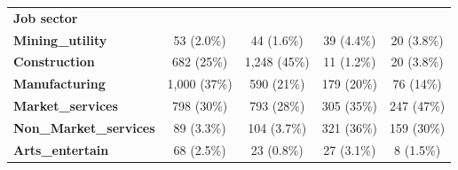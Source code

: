 \begin{table}
{\begin{tabular}[t]{>{}lcccc}
\textbf{Job sector} &  &  &  & \\
\textbf{Mining\_utility} & 53 (2.0\%) & 44 (1.6\%) & 39 (4.4\%) & 20 (3.8\%)\\
\addlinespace
\textbf{Construction} & 682 (25\%) & 1,248 (45\%) & 11 (1.2\%) & 20 (3.8\%)\\
\textbf{Manufacturing} & 1,000 (37\%) & 590 (21\%) & 179 (20\%) & 76 (14\%)\\
\textbf{Market\_services} & 798 (30\%) & 793 (28\%) & 305 (35\%) & 247 (47\%)\\
\textbf{Non\_Market\_services} & 89 (3.3\%) & 104 (3.7\%) & 321 (36\%) & 159 (30\%)\\
\textbf{Arts\_entertain} & 68 (2.5\%) & 23 (0.8\%) & 27 (3.1\%) & 8 (1.5\%)\\
\bottomrule
\end{tabular}}
\end{table}
